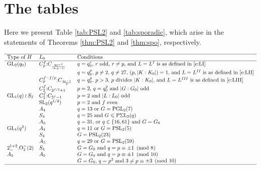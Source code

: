\documentclass[twoside,a4paper,reqno,11pt]{amsart}
\newcommand{\<}{\langle}
\renewcommand{\>}{\rangle}
\newcommand{\leqs}{\leqslant}
\newcommand{\soc}{\mathrm{soc}}
\newcommand{\PSL}{\mathrm{PSL}}
\newcommand{\GL}{\mathrm{GL}}
\newcommand{\PGL}{\mathrm{PGL}}
\newcommand{\SL}{\mathrm{SL}}
\newcommand{\PSigmaL}{\mathrm{P\Sigma L}}
\theoremstyle{definition}
\begin{document}
	\section{The tables}
	
	\label{s:tab}
	
	Here we present Table \ref{tab:PSL2} and \ref{tab:sporadic}, which arise in the statements of Theorems \ref{thm:PSL2} and \ref{thm:spo}, respectively.
	
	{\small
		\begin{table}
			\[
			\begin{array}{lll} \hline
			\mbox{Type of $H$}&L_0&\mbox{Conditions}\\\hline
			\GL_2(q_0) & C_p^f{:}C_{\frac{q_0-1}{(2,q-1)}} & \mbox{$q = q_0^r$, $r$ odd, $r\ne p$, and $L = L^{\rm I}$ is as defined in \eqref{e:LI}}\\
			& & \mbox{$q = q_0^p$, $p\ne 2$, $q \ne 27$, $(p,|K:K_0|) = 1$, and $L = L^{\rm II}$ is as defined in \eqref{e:LII}}\\
			& C_p^{f-f/p}{:}C_{\frac{q_0-1}{2}} & \mbox{$q = q_0^p$, $p > 3$, $p$ divides $|K:K_0|$, and $L = L^{\rm III}$ is as defined in \eqref{e:LIII}}\\
			& C_2^f{:}C_{2^{f/2}+1} & \mbox{$p = 2$, $q = q_0^2$ and $|G:G_0|$ odd}\\
			\GL_1(q)\wr S_2 & C_2^f{:}C_{2^f-1} & \mbox{$p = 2$ and $|L:L_0|$ odd}\\
			& \SL_2(q^{1/2}) & \mbox{$p = 2$ and $f$ even}\\
			& A_4 & \mbox{$q = 13$ or $G = \PGL_2(7)$}\\
			& S_4 & \mbox{$q = 25$ and $G\leqs\PSigmaL_2(q)$}\\
			& A_5 & \mbox{$q = 31$, or $q\in\{16,61\}$ and $G = G_0$}\\
			\GL_1(q^2) & A_4 & \mbox{$q = 11$ or $G = \PSL_2(5)$}\\
			& S_4 & G = \PSL_2(23)\\
			& A_5 & \mbox{$q = 29$ or $G = \PSL_2(59)$}\\
			2^{1+2}_-.\mathrm{O}_2^-(2) & S_4 & \mbox{$G = G_0$ and $q = p\equiv \pm 1\pmod 8$}\\
			A_5 & A_5 & \mbox{$G = G_0$ and $q = p\equiv \pm 1\pmod{10}$}\\
			& & \mbox{$G = G_0$, $q = p^2$ and $3\ne p\equiv \pm 3\pmod{10}$}\\
			\hline
			\end{array}
			\]
			\caption{Maximal non-stable fixers of $G$ with $\soc(G) = \PSL_2(q)$}
			\label{tab:PSL2}
	\end{table}}
	
\end{document}
